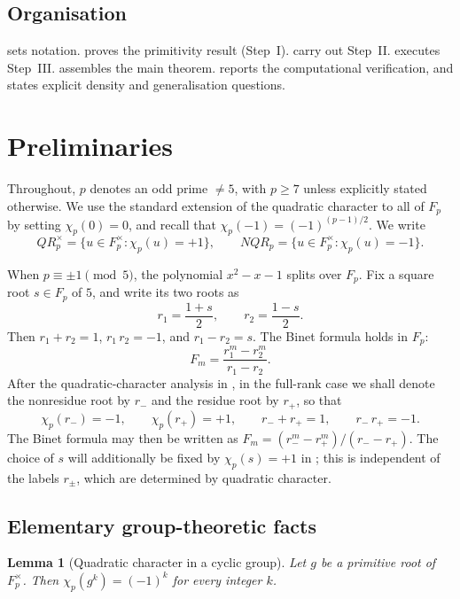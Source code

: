 \documentclass[preprint,5p,times,twocolumn]{elsarticle}
\def\F{F}\def\Z{Z}\def\Q{Q}\def\R{R}\def\N{N}%
\def\QR{QR}\def\NQR{NQR}}
\newtheorem{lemma}[theorem]{Lemma}
\newcommand{\Z}{\mathbb{Z}}
\newcommand{\Q}{\mathbb{Q}}
\newcommand{\R}{\mathbb{R}}
\newcommand{\F}{\mathbb{F}}
\newcommand{\N}{\mathbb{N}}
\newcommand{\QR}{\mathrm{QR}}
\newcommand{\NQR}{\mathrm{NQR}}
\begin{document}
\subsection{Organisation}

 sets notation.  
proves the primitivity result (Step~I). 
 carry out 
Step~II.  executes Step~III. 
 assembles the main theorem. 
 reports the computational verification, 
and  states explicit density and 
generalisation questions.

\section{Preliminaries}\label{sec:preliminaries}

Throughout, $p$ denotes an odd prime $\ne 5$, with $p\ge 7$ 
unless explicitly stated otherwise. We use the standard extension 
of the quadratic character to all of $\F_p$ by setting 
$\chi_p(0)=0$, and recall that 
$\chi_p(-1)=(-1)^{(p-1)/2}$. We write
\[
\QR_p^\times=\{u\in\F_p^\times:\chi_p(u)=+1\},\qquad
\NQR_p=\{u\in\F_p^\times:\chi_p(u)=-1\}.
\]

When $p\equiv\pm 1\pmod 5$, the polynomial $x^2-x-1$ splits 
over $\F_p$. Fix a square root $s\in\F_p$ of $5$, and write 
its two roots as
\[
r_1=\frac{1+s}{2},\qquad r_2=\frac{1-s}{2}.
\]
Then $r_1+r_2=1$, $r_1\,r_2=-1$, and $r_1-r_2=s$. The Binet 
formula holds in $\F_p$:
\begin{equation}\label{eq:binet}
F_m=\frac{r_1^m-r_2^m}{r_1-r_2}.
\end{equation}
After the quadratic-character analysis in , in the 
full-rank case we shall denote the nonresidue root by $r_-$ and 
the residue root by $r_+$, so that
\[
\chi_p(r_-)= -1,\qquad \chi_p(r_+)=+1,\qquad
r_-+r_+=1,\qquad r_-\,r_+=-1.
\]
The Binet formula may then be written as
$F_m=(r_-^m-r_+^m)/(r_- - r_+)$.
The choice of $s$ will additionally be fixed by $\chi_p(s)=+1$ 
in ; this is independent of the labels 
$r_\pm$, which are determined by quadratic character.

\subsection*{Elementary group-theoretic facts}

\begin{lemma}[Quadratic character in a cyclic group]
\label{lem:cyclic-character}
Let $g$ be a primitive root of $\F_p^\times$. Then 
$\chi_p(g^k)=(-1)^k$ for every integer $k$.
\end{lemma}
\end{document}
